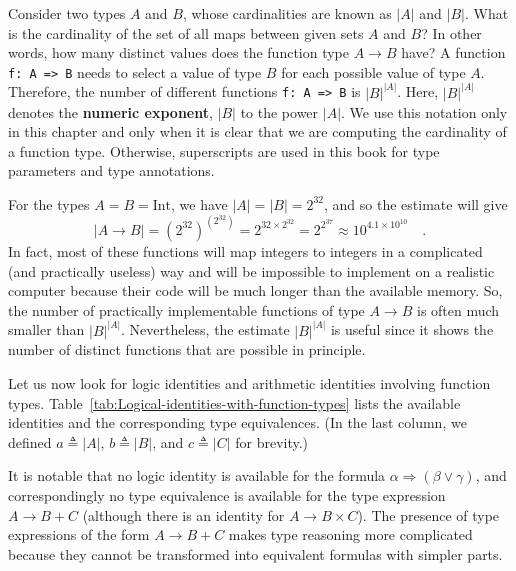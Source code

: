 Consider two types $A$ and $B$, whose cardinalities are known as
$\left|A\right|$ and $\left|B\right|$. What is the cardinality of
the set of all maps between given sets $A$ and $B$? In other words,
how many distinct values does the function type $A\rightarrow B$
have? A function \lstinline!f: A => B! needs to select a value of
type $B$ for each possible value of type $A$. Therefore, the number
of different functions \lstinline!f: A => B! is $\left|B\right|^{\left|A\right|}$.
Here, $\left|B\right|^{\left|A\right|}$ denotes the \textbf{numeric
exponent}, $\left|B\right|$ to the power $\left|A\right|$.
We use this notation only in this chapter and only when it is clear
that we are computing the cardinality of a function type. Otherwise,
superscripts are used in this book for type parameters and type annotations.

For the types $A=B=\text{Int}$, we have $\left|A\right|=\left|B\right|=2^{32}$,
and so the estimate will give 
\[
\left|A\rightarrow B\right|=(2^{32})^{\left(2^{32}\right)}=2^{32\times2^{32}}=2^{2^{37}}\approx10^{4.1\times10^{10}}\quad.
\]
In fact, most of these functions will map integers to integers in
a complicated (and practically useless) way and will be impossible
to implement on a realistic computer because their code will be much
longer than the available memory. So, the number of practically implementable
functions of type $A\rightarrow B$ is often much smaller than $\left|B\right|^{\left|A\right|}$.
Nevertheless, the estimate $\left|B\right|^{\left|A\right|}$ is useful
since it shows the number of distinct functions that are possible
in principle.

Let us now look for logic identities and arithmetic identities involving
function types. Table~\ref{tab:Logical-identities-with-function-types}
lists the available identities and the corresponding type equivalences.
(In the last column, we defined $a\triangleq\left|A\right|$, $b\triangleq\left|B\right|$,
and $c\triangleq\left|C\right|$ for brevity.) 

It is notable that no logic identity is available for the formula
$\alpha\Rightarrow\left(\beta\vee\gamma\right)$, and correspondingly
no type equivalence is available for the type expression $A\rightarrow B+C$
(although there is an identity for $A\rightarrow B\times C$). The
presence of type expressions of the form $A\rightarrow B+C$ makes
type reasoning more complicated because they cannot be transformed
into equivalent formulas with simpler parts.

